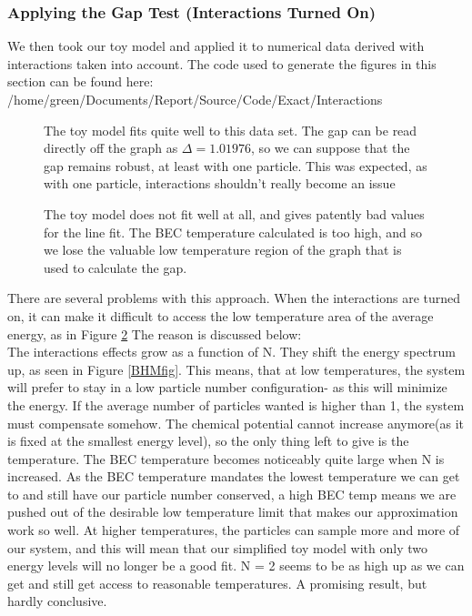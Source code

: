 \documentclass[12pt]{article}
\begin{document}
\subsubsection{Applying the Gap Test (Interactions Turned On)}
We then took our toy model and applied it to numerical data derived with
interactions taken into account.
The code used to generate the figures in this section can be found here:
\\
/home/green/Documents/Report/Source/Code/Exact/Interactions

\bigskip
\begin{figure}[H]
	\centerline{}
	\caption{ The toy model fits quite well to this data set. The gap
          can be read directly off the graph as $\Delta = 1.01976$, so
          we can suppose that the gap remains robust, at least with one
          particle. This was expected, as with one particle, interactions
          shouldn't really become an issue
        }
        \label{fig:toyapplyN1}
          
\end{figure}

\begin{figure}[H]
	\centerline{}
	\caption{ The toy model does not fit well at all, and gives patently
          bad values for the line fit. The BEC temperature calculated
          is too high, and so we lose the valuable low temperature region
          of the graph that is used to calculate the gap.
        }
        \label{fig:toyapplyN2}
\end{figure}


There are several problems with this approach. When the interactions
are turned on, it can make it difficult to access the low temperature
area of the average energy, as in Figure \ref{fig:toyapplyN2}
The reason is discussed below:
\\
The interactions effects grow as a function of N. They shift the energy spectrum
up, as seen in Figure \ref{BHMfig}. This means, that at low temperatures,
the system will prefer to stay in a low particle number configuration- as
this will minimize the energy. If the average number of particles wanted is 
higher than 1, the system must compensate somehow. The chemical potential
cannot increase anymore(as it is fixed at the smallest energy level), so
the only thing left to give is the temperature.
The BEC temperature becomes noticeably quite large when N is increased.
As the BEC temperature mandates the lowest temperature we can get to and
still have our particle number conserved, a high BEC temp means we
are pushed out of the desirable low temperature limit that makes our
approximation work so well.
At higher temperatures, the particles can sample more and more of our system,
and this will mean that our simplified toy model with only two energy levels
will no longer be a good fit.
N = 2 seems to be as high up as we can get and still get access to reasonable
temperatures. A promising result, but hardly conclusive.
\end{document}
